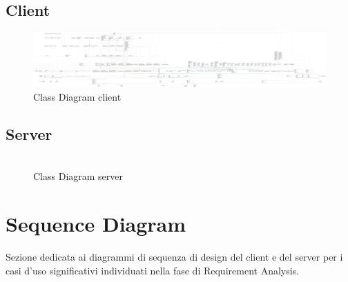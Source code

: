         \subsection{Client}
            \begin{figure}[htbp!]
                \includegraphics[width=0.9\linewidth]{Immagini/Diagrammi/Class Diagram/Design/ClassDiagramClient.pdf}
            \caption{Class Diagram client}
            \label{fig:Class Diagram client}
            \end{figure}
    
        \subsection{Server}
            \begin{figure}[htbp!]
                \includegraphics[width=0.35\linewidth]{Immagini/Diagrammi/Class Diagram/Design/ClassDiagramServer.pdf}
            \caption{Class Diagram server}
            \label{fig:Class Diagram server}
            \end{figure}

    \clearpage
    
    \section{Sequence Diagram}
        Sezione dedicata ai diagrammi di sequenza di design del client e del server per i casi d'uso significativi individuati nella fase di Requirement Analysis.
        
